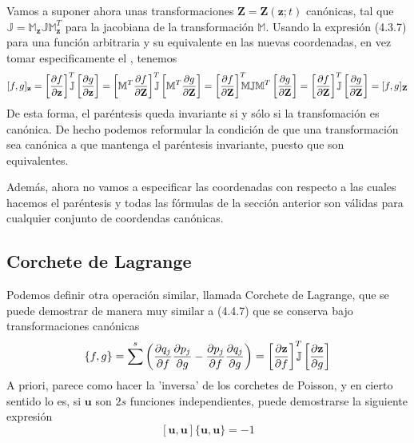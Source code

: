 Vamos a suponer ahora unas transformaciones $\mathbf{Z}=\mathbf{Z}(\mathbf{z};t)$ canónicas, tal que $\mathbb{J} = \mathbb{M}_\mathbf{z}\mathbb{J}\mathbb{M}_\mathbf{z}^T$ para la jacobiana de la transformación $\mathbb{M}$. Usando la expresión (4.3.7) para una función arbitraria y su equivalente en las nuevas coordenadas, en vez tomar especificamente el , tenemos
\begin{equation} \label{4.4.7}
    [f,g]_\mathbf{z} = \left[\frac{\partial f}{\partial \mathbf{z}}\right]^T \hspace{-7pt} \mathbb{J} \left[\frac{\partial g}{\partial \mathbf{z}}\right] = \left[\mathbb{M}^T\frac{\partial f}{\partial \mathbf{Z}}\right]^T \hspace{-7pt} \mathbb{J} \left[\mathbb{M}^T\frac{\partial g}{\partial \mathbf{Z}}\right] = \left[\frac{\partial f}{\partial \mathbf{Z}}\right]^T \hspace{-7pt}\mathbb{M} \mathbb{J}\mathbb{M}^T \left[\frac{\partial g}{\partial \mathbf{Z}}\right] = \left[\frac{\partial f}{\partial \mathbf{Z}}\right]^T \hspace{-7pt} \mathbb{J} \left[\frac{\partial g}{\partial \mathbf{Z}}\right] = [f,g]_\mathbf{Z}
\end{equation} 
De esta forma, el paréntesis queda invariante si y sólo si la transfomación es canónica. De hecho podemos reformular la condición de que una transformación sea canónica a que mantenga el paréntesis invariante, puesto que son equivalentes.

Además, ahora no vamos a especificar las coordenadas con respecto a las cuales hacemos el paréntesis y todas las fórmulas de la sección anterior son válidas para cualquier conjunto de coordendas canónicas.
\subsection{Corchete de Lagrange}
Podemos definir otra operación similar, llamada Corchete de Lagrange, que se puede demostrar de manera muy similar a (4.4.7) que se conserva bajo transformaciones canónicas
\begin{equation} \label{4.4.3}
    \{f,g\}=  \sum^s \left(\frac{\partial q_j}{\partial f}\frac{\partial p_j}{\partial g}-\frac{\partial p_j}{\partial f}\frac{\partial q_j}{\partial g}\right) = \left[\frac{\partial \mathbf{z}}{\partial f}\right]^T \hspace{-7pt} \mathbb{J} \left[\frac{\partial \mathbf{z}}{\partial g}\right]
\end{equation} 
A priori, parece como hacer la 'inversa' de los corchetes de Poisson, y en cierto sentido lo es, si $\mathbf{u}$ son $2s$ funciones independientes, puede demostrarse la siguiente expresión
\begin{equation} \label{4.4.3}
    [\mathbf{u},\mathbf{u}]\{\mathbf{u},\mathbf{u}\}=  -1
\end{equation} 
